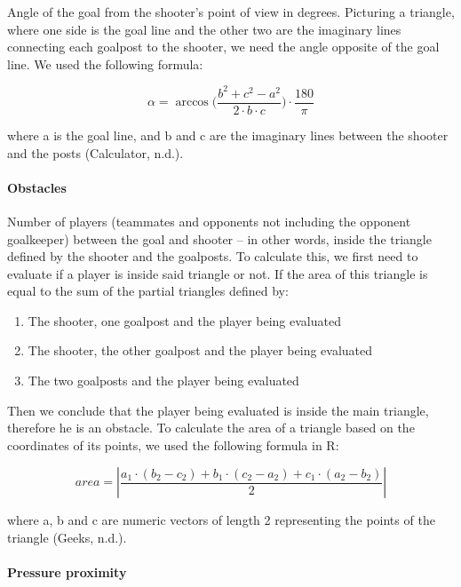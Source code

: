 \documentclass[]{article}
\let\oldparagraph\paragraph
\renewcommand{\paragraph}[1]{\oldparagraph{#1}\mbox{}}
\begin{document}
Angle of the goal from the shooter's point of view in degrees. Picturing
a triangle, where one side is the goal line and the other two are the
imaginary lines connecting each goalpost to the shooter, we need the
angle opposite of the goal line. We used the following formula:

\[
\alpha = \arccos\bigg(\frac{b^2+c^2-a^2}{2\cdot b\cdot c}\bigg)\cdot\frac{180}{\pi}
\]

where a is the goal line, and b and c are the imaginary lines between
the shooter and the posts (Calculator, n.d.).

\hypertarget{obstacles}{%
\paragraph{Obstacles}\label{obstacles}}

Number of players (teammates and opponents not including the opponent
goalkeeper) between the goal and shooter -- in other words, inside the
triangle defined by the shooter and the goalposts. To calculate this, we
first need to evaluate if a player is inside said triangle or not. If
the area of this triangle is equal to the sum of the partial triangles
defined by:

\begin{enumerate}
\def\labelenumi{\arabic{enumi}.}
\item
  The shooter, one goalpost and the player being evaluated
\item
  The shooter, the other goalpost and the player being evaluated
\item
  The two goalposts and the player being evaluated
\end{enumerate}

Then we conclude that the player being evaluated is inside the main
triangle, therefore he is an obstacle. To calculate the area of a
triangle based on the coordinates of its points, we used the following
formula in R:

\[
area = \left\lvert \frac{a_1\cdot(b_2-c_2)+b_1\cdot(c_2-a_2)+c_1\cdot(a_2-b_2)}{2} \right\rvert 
\]

where a, b and c are numeric vectors of length 2 representing the points
of the triangle (Geeks, n.d.).

\hypertarget{pressure-proximity}{%
\paragraph{Pressure proximity}\label{pressure-proximity}}
\end{document}
